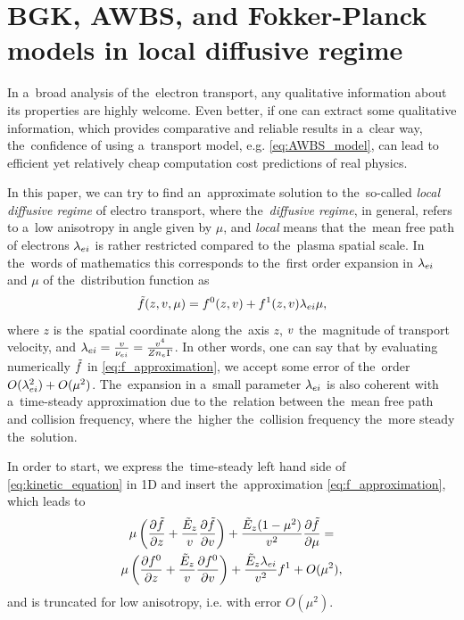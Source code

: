 \section{BGK, AWBS, and Fokker-Planck models in local diffusive regime}
\label{app:DiffusiveKinetics}

In a~broad analysis of the~electron transport, any qualitative information
about its properties are highly welcome. Even better, if one can extract some 
qualitative information, which provides comparative and reliable results in 
a~clear way, the~confidence of using a~transport model, 
e.g. \eqref{eq:AWBS_model}, can lead to efficient yet relatively
cheap computation cost predictions of real physics.

In this paper, we can try to find an~approximate solution to the~so-called
\textit{local diffusive regime} of electro transport, 
where the~\textit{diffusive regime}, in general, refers to a~low anisotropy 
in angle given by $\mu$, and \textit{local} means that the~mean free path of 
electrons $\lambda_{ei}$ is rather restricted compared to the~plasma spatial scale. 
In the~words of mathematics this corresponds to the~first 
order expansion in $\lambda_{ei}$ and $\mu$ of the~distribution function as
\begin{equation}
  \tilde{f}(z, v, \mu) = f^0(z, v) + f^1(z, v) \lambda_{ei}\mu ,
  \label{app_eq:f_approximation}
\end{equation}
where $z$ is the~spatial coordinate along the~axis $z$, $v$ the~magnitude 
of transport velocity, and 
$\lambda_{ei} = \frac{v}{\nu_{ei}} = \frac{v^4}{Z n_e \Gamma}$.
In other words, one can say that by evaluating numerically $\tilde{f}$
in \eqref{eq:f_approximation}, we accept some error of the~order 
$O(\lambda_{ei}^2) + O(\mu^2)$. The~expansion in a~small parameter $\lambda_{ei}$ is also
coherent with a~time-steady approximation due to the~relation between the~mean
free path and collision frequency, where the~higher the~collision frequency 
the~more steady the~solution. 

In order to start, we express the~time-steady left hand side of 
\eqref{eq:kinetic_equation}
in 1D and insert the~approximation \eqref{eq:f_approximation}, which leads to
\begin{multline}
  \mu\left(\frac{\partial{\tilde{f}}}{\partial{z}} + \frac{\tilde{E}_z}{v}\frac{\partial{\tilde{f}}}{\partial{v}}\right) 
  + \frac{\tilde{E}_z(1-\mu^2)}{v^2}\frac{\partial{\tilde{f}}}{\partial{\mu}} = \\
  \mu\left(\frac{\partial{f^0}}{\partial{z}} + \frac{\tilde{E}_z}{v}\frac{\partial{f^0}}{\partial{v}}\right) 
  + \frac{\tilde{E}_z\lambda_{ei}}{v^2} f^1 + O(\mu^2) ,
  \label{app_eq:LHS_kinetic_equation}
\end{multline}
and is truncated for low anisotropy, i.e. with error $O(\mu^2)$.

